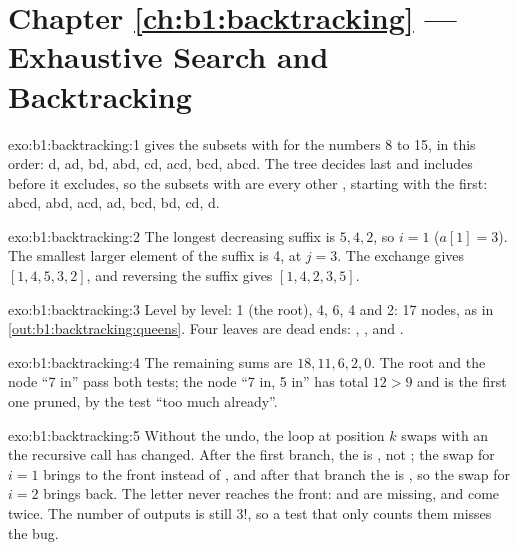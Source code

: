 \section*{Chapter \ref{ch:b1:backtracking} --- Exhaustive Search and Backtracking}

\begin{solution}{exo:b1:backtracking:1}
 gives the subsets with  for the numbers 8 to 15, in this order: d, ad, bd, abd, cd, acd,
bcd, abcd. The tree decides  last and includes before it excludes, so the subsets with  are every other
, starting with the first: abcd, abd, acd, ad, bcd, bd, cd, d.
\end{solution}

\begin{solution}{exo:b1:backtracking:2}
The longest decreasing suffix is $5, 4, 2$, so $i = 1$ ($a[1] = 3$). The smallest larger element of the suffix is 4,
at $j = 3$. The exchange gives $[1, 4, 5, 3, 2]$, and reversing the suffix gives $[1, 4, 2, 3, 5]$.
\end{solution}

\begin{solution}{exo:b1:backtracking:3}
Level by level: 1 (the root), 4, 6, 4 and 2: 17 nodes, as in \cref{out:b1:backtracking:queens}. Four leaves are dead
ends: , ,  and .
\end{solution}

\begin{solution}{exo:b1:backtracking:4}
The remaining sums are $18, 11, 6, 2, 0$. The root and the node ``7 in'' pass both tests; the node ``7 in, 5 in'' has
total $12 > 9$ and is the first one pruned, by the test ``too much already''.
\end{solution}

\begin{solution}{exo:b1:backtracking:5}
Without the undo, the loop at position $k$ swaps with an  the recursive call has changed. After the first branch,
the  is , not ; the swap for $i = 1$ brings  to the front instead of , and
after that branch the  is , so the swap for $i = 2$ brings  back. The letter  never
reaches the front:  and  are missing,  and  come twice. The number of outputs is
still $3!$, so a test that only counts them misses the bug.
\end{solution}

